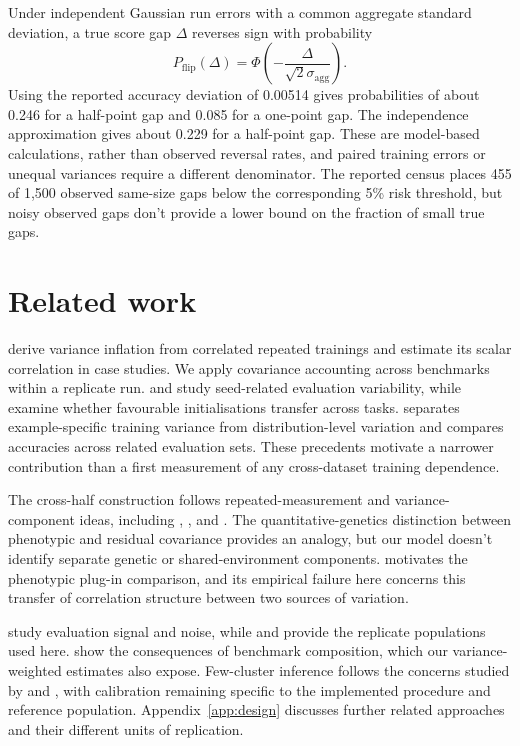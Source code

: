 \documentclass{article}
\begin{document}
Under independent Gaussian run errors with a common aggregate standard deviation, a true score gap $\Delta$ reverses sign with probability
\begin{equation}
P_{\mathrm{flip}}(\Delta)=\Phi\left(-\frac{\Delta}{\sqrt{2}\sigma_{\mathrm{agg}}}\right).
\end{equation}
Using the reported accuracy deviation of 0.00514 gives probabilities of about 0.246 for a half-point gap and 0.085 for a one-point gap. The independence approximation gives about 0.229 for a half-point gap. These are model-based calculations, rather than observed reversal rates, and paired training errors or unequal variances require a different denominator. The reported census places 455 of 1,500 observed same-size gaps below the corresponding 5\% risk threshold, but noisy observed gaps don't provide a lower bound on the fraction of small true gaps.

\section{Related work}
\citet{bouthillier2021} derive variance inflation from correlated repeated trainings and estimate its scalar correlation in case studies. We apply covariance accounting across benchmarks within a replicate run. \citet{reimers2017} and \citet{madaan2024} study seed-related evaluation variability, while \citet{dodge2020} examine whether favourable initialisations transfer across tasks. \citet{jordan2024} separates example-specific training variance from distribution-level variation and compares accuracies across related evaluation sets. These precedents motivate a narrower contribution than a first measurement of any cross-dataset training dependence.

The cross-half construction follows repeated-measurement and variance-component ideas, including \citet{spearman1904}, \citet{cronbach1951}, and \citet{searle1992}. The quantitative-genetics distinction between phenotypic and residual covariance provides an analogy, but our model doesn't identify separate genetic or shared-environment components. \citet{cheverud1988} motivates the phenotypic plug-in comparison, and its empirical failure here concerns this transfer of correlation structure between two sources of variation.

\citet{heineman2025} study evaluation signal and noise, while \citet{magnusson2025} and \citet{vanderwal2025} provide the replicate populations used here. \citet{dehghani2021} show the consequences of benchmark composition, which our variance-weighted estimates also expose. Few-cluster inference follows the concerns studied by \citet{cameron2008} and \citet{mackinnon2017}, with calibration remaining specific to the implemented procedure and reference population. Appendix~\ref{app:design} discusses further related approaches and their different units of replication.
\end{document}
